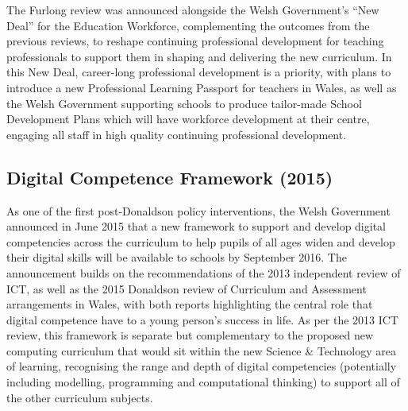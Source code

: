 \documentclass{sig-alternate}
\begin{document}

The Furlong review was announced alongside the Welsh Government's ``New
Deal'' for the Education Workforce, complementing the outcomes from the
previous reviews, to reshape continuing professional development for
teaching professionals to support them in shaping and delivering the
new curriculum. In this New Deal, career-long professional development
is a priority, with plans to introduce a new Professional Learning
Passport for teachers in Wales, as well as the Welsh Government
supporting schools to produce tailor-made School Development Plans
which will have workforce development at their centre, engaging all
staff in high quality continuing professional development.

\subsection{Digital Competence Framework (2015)}

As one of the first post-Donaldson policy interventions, the Welsh
Government announced in June 2015 that a new framework to support and
develop digital competencies across the curriculum to help pupils of
all ages widen and develop their digital skills will be available to
schools by September 2016. The announcement builds on the
recommendations of the 2013 independent review of ICT, as well as the
2015 Donaldson review of Curriculum and Assessment arrangements in
Wales, with both reports highlighting the central role that digital
competence have to a young person’s success in life. As per the 2013
ICT review, this framework is separate but complementary to the
proposed new computing curriculum that would sit within the new
Science \& Technology area of learning, recognising the range and
depth of digital competencies (potentially including modelling,
programming and computational thinking) to support all of the other
curriculum subjects.
\end{document}
